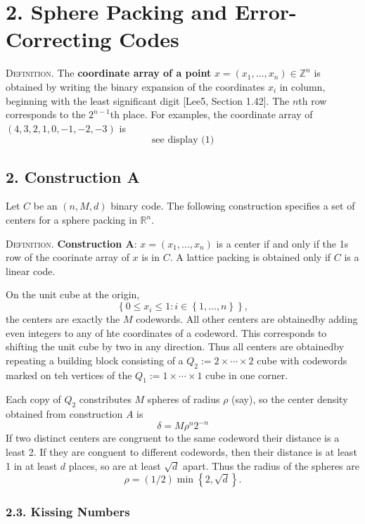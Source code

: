 \documentclass{article}
\newcommand{\Z}{\mathbb{Z}}
\newcommand{\R}{\mathbb{R}}
\newcommand{\set}[1]{\left\{ #1 \right\}}
\newcommand{\header}[1]{\vspace{1em}\noindent\textsc{#1.} }
\begin{document}
\section*{2. Sphere Packing and Error-Correcting Codes}

\header{Definition}
The \textbf{coordinate array of a point} $x = (x_1, \dots, x_n) \in \Z^n$ is obtained by writing the binary expansion of the coordinates $x_i$ in column, beginning with the least significant digit [Lee5, Section 1.42].
The $n$th row corresponds to the $2^{n-1}$th place.
For examples, the coordinate array of $(4,3,2,1,0,-1,-2,-3)$ is
$$
\text{see display (1)}
$$

\subsection*{2. Construction A}

Let $C$ be an $(n,M,d)$ binary code.
The following construction specifies a set of centers for a sphere packing in $\R^n$.

\header{Definition}
\textbf{Construction A}: $x = (x_1, \dots, x_n)$ is a center if and only if the 1s row of the coorinate array of $x$ is in $C$.
A lattice packing is obtained only if $C$ is a linear code.

On the unit cube at the origin,
$$ \set{ 0 \leq x_i \leq 1 : i \in \set{1,\dots,n} }, $$
the centers are exactly the $M$ codewords.
All other centers are obtainedby adding even integers to any of hte coordinates of a codeword.
This corresponds to shifting the unit cube by two in any direction.
Thus all centers are obtainedby repeating a building block consisting of a $Q_2 := 2 \times \cdots \times 2$ cube with codewords marked on teh vertices of the $Q_1 := 1 \times \cdots \times 1$ cube in one corner.

Each copy of $Q_2$ constributes $M$ spheres of radius $\rho$ (say), so the center density obtained from construction $A$ is
$$ \delta = M \rho^n 2^{-n} $$
If two distinct centers are congruent to the same codeword their distance is a least 2.
If they are conguent to different codewords, then their distance is at least 1 in at least $d$ places, so are at least $\sqrt d$ apart.
Thus the radius of the spheres are
$$ \rho = (1/2) \min \set{ 2, \sqrt d }. $$

\subsubsection*{2.3. Kissing Numbers}
\end{document}
